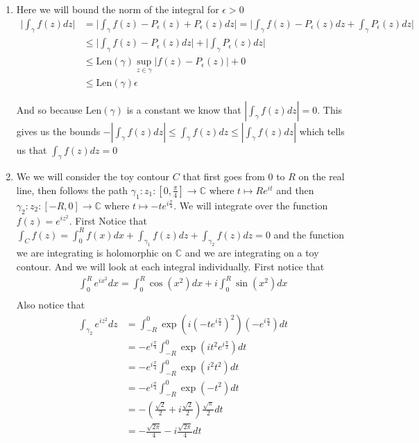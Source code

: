 \documentclass[12pt]{amsart}
\theoremstyle{definition}
\newcommand{\C}{\mathbb{C}}
\newcommand{\ra}{\rightarrow}
\begin{document}
\begin{enumerate}
\begin{enumerate}
\end{enumerate}

\item Here we will bound the norm of the integral for $\epsilon>0$
\begin{align*}
    \Big|\int_\gamma f(z)dz\Big|&= \Big|\int_\gamma f(z)-P_\epsilon(z)+P_\epsilon(z)dz\Big| = \Big|\int_\gamma f(z)-P_\epsilon(z)dz+\int_\gamma P_\epsilon(z)dz\Big|\\
    &\leq \Big|\int_\gamma f(z)-P_\epsilon(z)dz\Big|+\Big|\int_\gamma P_\epsilon(z)dz\Big|\\
    &\leq \text{Len}(\gamma)\sup_{z\in\gamma} |f(z)-P_\epsilon(z)|+0\\
    &\leq \text{Len}(\gamma)\epsilon
\end{align*}

And so because $\text{Len}(\gamma)$ is a constant we know that $|\int_\gamma f(z)dz|=0$. This gives us the bounds $-|\int_\gamma f(z)dz|\leq \int_\gamma f(z)dz\leq |\int_\gamma f(z)dz|$ which tells us that $\int_\gamma f(z)dz=0$\\

\item We we will consider the toy contour $C$ that first goes from $0$ to $R$ on the real line, then  follows the path $\gamma_1: z_1:[0,\frac{\pi}{4}]\ra \C$ where $t\mapsto Re^{it}$ and then $\gamma_2: z_2:[-R,0]\ra \C$ where $t\mapsto -te^{i\frac{\pi}{4}}$. We will integrate over the function $f(z)=e^{iz^2}$. First Notice that $\int_{C}f(z)=\int_0^Rf(x)dx+\int_{\gamma_1}f(z)dz+\int_{\gamma_2}f(z)dz=0$ and the function we are integrating is holomorphic on $\C$ and we are integrating on a toy contour.
And we will look at each integral individually. First notice that 
\begin{align*}
    \int_0^Re^{ix^2}dx=\int_0^R\cos(x^2)dx+i\int_{0}^R\sin(x^2)dx\\
\end{align*}
Also notice that
\begin{align*}
    \int_{\gamma_2}e^{iz^2}dz&= \int_{-R}^0\exp(i(-te^{i\frac{\pi}{4}})^2)(-e^{i\frac{\pi}{4}})dt\\
    &=-e^{i\frac{\pi}{4}}\int_{-R}^0\exp(it^2e^{i\frac{\pi}{2}})dt\\
    &=-e^{i\frac{\pi}{4}}\int_{-R}^0\exp(i^2t^2)dt\\
    &=-e^{i\frac{\pi}{4}}\int_{-R}^0\exp(-t^2)dt\\
    &=-(\frac{\sqrt{2}}{2}+i\frac{\sqrt{2}}{2})\frac{\sqrt{\pi}}{2}dt\\
    &=-\frac{\sqrt{2\pi}}{4}-i\frac{\sqrt{2\pi}}{4}dt
\end{align*}


\end{enumerate}
\end{document}
